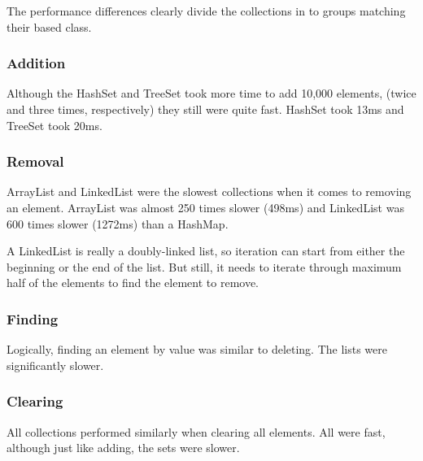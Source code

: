 The performance differences clearly divide the collections in to groups matching their based class.

\subsubsection{Addition}
Although the HashSet and TreeSet took more time to add 10,000 elements, (twice and three times, respectively) they still were quite fast. HashSet took 13ms and TreeSet took 20ms.

\subsubsection{Removal}
ArrayList and LinkedList were the slowest collections when it comes to removing an element. ArrayList was almost 250 times slower (498ms) and LinkedList was 600 times slower (1272ms) than a HashMap.

A LinkedList is really a doubly-linked list, so iteration can start from either the beginning or the end of the list. But still, it needs to iterate through maximum half of the elements to find the element to remove.

\subsubsection{Finding}
Logically, finding an element by value was similar to deleting. The lists were significantly slower.

\subsubsection{Clearing}
All collections performed similarly when clearing all elements. All were fast, although just like adding, the sets were slower.


